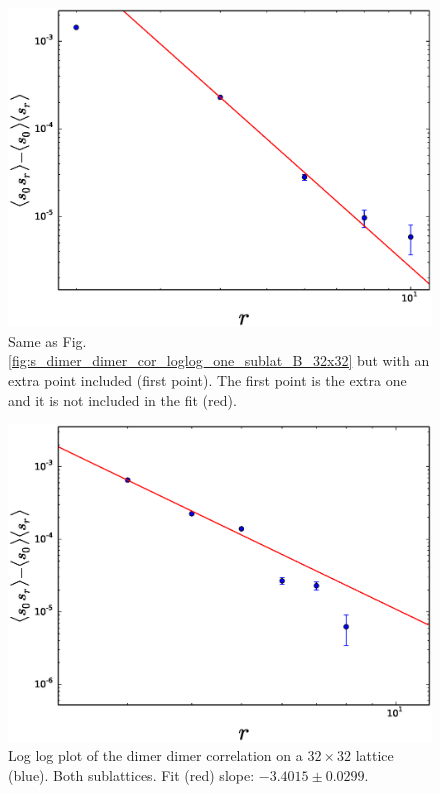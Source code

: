 \documentclass[aps,floatfix,11pt]{revtex4-1}
\begin{document}
\begin{figure}[h]
    \centering
    \includegraphics[width=8.5 cm]{s_dimer_dimer_cor_loglog_one_sublat_B_32x32_extra_pnt}
    \caption{Same as Fig. \ref{fig:s_dimer_dimer_cor_loglog_one_sublat_B_32x32} but with an extra
        point included (first point). The first point is the extra one and it is not included in the fit (red).
    \label{fig:s_dimer_dimer_cor_loglog_one_sublat_B_32x32_extra_pnt}}
\end{figure}

\begin{figure}[h]
    \centering
    \includegraphics[width=8.5 cm]{s_dimer_dimer_cor_loglog_both_sublat_32x32}
    \caption{Log log plot of the dimer dimer correlation on a $32\times32$ lattice (blue). 
        Both sublattices. Fit (red) slope: $-3.4015 \pm 0.0299$.
    \label{fig:s_dimer_dimer_cor_loglog_both_sublat_32x32}}
\end{figure}
\end{document}

